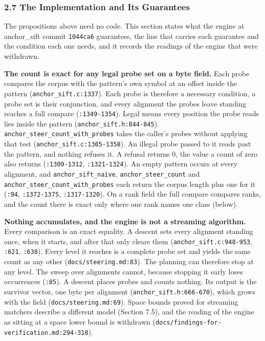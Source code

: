 \subsubsection{2.7 The Implementation and Its Guarantees}

The propositions above need no code. This section states what the engine at anchor\_sift commit \texttt{1044ca6} guarantees, the line that carries each guarantee and the condition each one needs, and it records the readings of the engine that were withdrawn.

\noindent\textbf{The count is exact for any legal probe set on a byte field.} Each probe compares the corpus with the pattern's own symbol at an offset inside the pattern (\texttt{anchor\_sift.c:1337}). Each probe is therefore a necessary condition, a probe set is their conjunction, and every alignment the probes leave standing reaches a full compare (\texttt{:1349-1354}). Legal means every position the probe reads lies inside the pattern (\texttt{anchor\_sift.h:844-845}). \texttt{anchor\_steer\_count\_with\_probes} takes the caller's probes without applying that test (\texttt{anchor\_sift.c:1305-1358}). An illegal probe passed to it reads past the pattern, and nothing refuses it. A refusal returns 0, the value a count of zero also returns (\texttt{:1309-1312}, \texttt{:1321-1324}). An empty pattern occurs at every alignment, and \texttt{anchor\_sift\_naive}, \texttt{anchor\_steer\_count} and \texttt{anchor\_steer\_count\_with\_probes} each return the corpus length plus one for it (\texttt{:94}, \texttt{:1372-1375}, \texttt{:1317-1320}). On a rank field the full compare compares ranks, and the count there is exact only where one rank names one class (below).

\noindent\textbf{Nothing accumulates, and the engine is not a streaming algorithm.} Every comparison is an exact equality. A descent sets every alignment standing once, when it starts, and after that only clears them (\texttt{anchor\_sift.c:948-953}, \texttt{:621}, \texttt{:638}). Every level it reaches is a complete probe set and yields the same count as any other (\texttt{docs/\allowbreak{}steering.md:83}). The planning can therefore stop at any level. The sweep over alignments cannot, because stopping it early loses occurrences (\texttt{:85}). A descent places probes and counts nothing. Its output is the survivor vector, one byte per alignment (\texttt{anchor\_sift.h:666-670}), which grows with the field (\texttt{docs/\allowbreak{}steering.md:69}). Space bounds proved for streaming matchers describe a different model (Section 7.5), and the reading of the engine as sitting at a space lower bound is withdrawn (\texttt{docs/\allowbreak{}findings-\allowbreak{}for-\allowbreak{}verification.md:294-\allowbreak{}310}).

